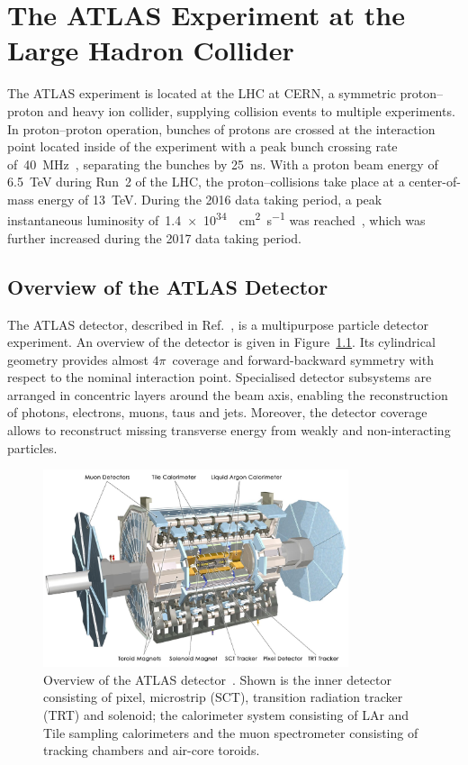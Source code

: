\chapter{The ATLAS Experiment at the Large Hadron Collider}
\label{chap:atlas}

The ATLAS experiment is located at the LHC at CERN, a symmetric proton--proton
and heavy ion collider, supplying collision events to multiple experiments. In
proton--proton operation, bunches of protons are crossed at the interaction
point located inside of the experiment with a peak bunch crossing rate
of~\SI{40}{\mega\hertz}~\cite{lhc}, separating the bunches by
\SI{25}{\nano\second}. With a proton beam energy of \SI{6.5}{\TeV} during Run~2
of the LHC, the proton--collisions take place at a center-of-mass energy of
\SI{13}{\TeV}. During the 2016 data taking period, a peak instantaneous
luminosity of~\SI{1.4e34}{\per\square\centi\metre\per\second} was
reached~\cite{lhc_2016_report}, which was further increased during the 2017 data
taking period.

\section{Overview of the ATLAS Detector}
\label{sec:atlas}

The ATLAS detector, described in Ref.\ \cite{atlas_detector}, is a multipurpose
particle detector experiment. An overview of the detector is given in
Figure~\ref{fig:atlas_detector}. Its cylindrical geometry provides almost
$4\pi$~coverage and forward-backward symmetry with respect to the nominal
interaction point. Specialised detector subsystems are arranged in concentric
layers around the beam axis, enabling the reconstruction of photons, electrons,
muons, taus and jets. Moreover, the detector coverage allows to reconstruct
missing transverse energy from weakly and non-interacting particles.

\begin{figure}[htb]
  \centering
  \includegraphics[width=0.8\textwidth]{./figures/atlas/overview.jpg}
  \caption[Overview of the ATLAS detector]{Overview of the ATLAS
    detector~\cite{atlas_detector}. Shown is the inner detector consisting of
    pixel, microstrip (SCT), transition radiation tracker (TRT) and solenoid;
    the calorimeter system consisting of LAr and Tile sampling calorimeters and
    the muon spectrometer consisting of tracking chambers and air-core toroids.}
  \label{fig:atlas_detector}
\end{figure}

